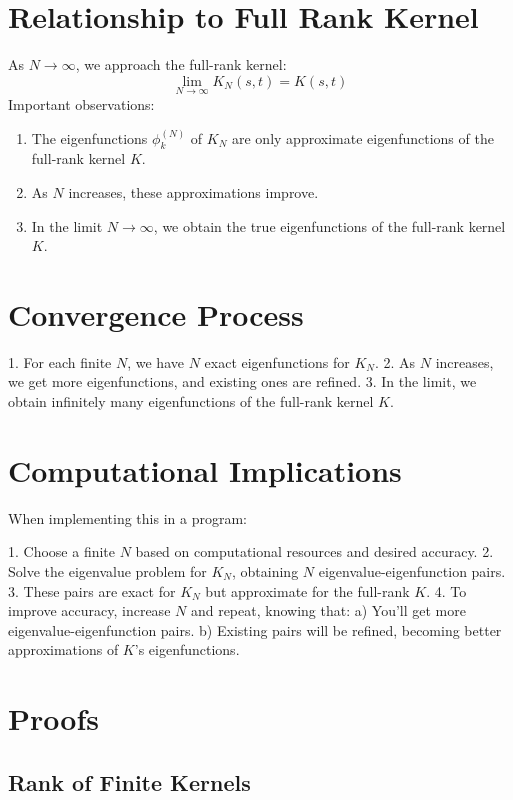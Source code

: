 \documentclass{article}
\begin{document}
\section{Relationship to Full Rank Kernel}

As $N \to \infty$, we approach the full-rank kernel:
\[ \lim_{N \to \infty} K_N (s, t) = K (s, t) \]
Important observations:
\begin{enumerate}
  \item The eigenfunctions $\phi_k^{(N)}$ of $K_N$ are only approximate
  eigenfunctions of the full-rank kernel $K$.
  
  \item As $N$ increases, these approximations improve.
  
  \item In the limit $N \to \infty$, we obtain the true eigenfunctions of the
  full-rank kernel $K$.
\end{enumerate}

\section{Convergence Process}

1. For each finite $N$, we have $N$ exact eigenfunctions for $K_N$. 2. As $N$
increases, we get more eigenfunctions, and existing ones are refined. 3. In
the limit, we obtain infinitely many eigenfunctions of the full-rank kernel
$K$.

\section{Computational Implications}

When implementing this in a program:

1. Choose a finite $N$ based on computational resources and desired accuracy.
2. Solve the eigenvalue problem for $K_N$, obtaining $N$
eigenvalue-eigenfunction pairs. 3. These pairs are exact for $K_N$ but
approximate for the full-rank $K$. 4. To improve accuracy, increase $N$ and
repeat, knowing that: a) You'll get more eigenvalue-eigenfunction pairs. b)
Existing pairs will be refined, becoming better approximations of $K$'s
eigenfunctions.

\section{Proofs}

\subsection{Rank of Finite Kernels}
\end{document}
